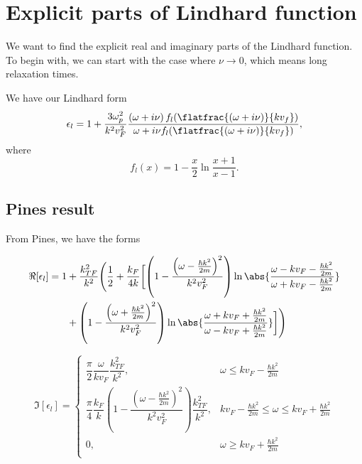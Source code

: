 \documentclass[../../main.tex]{subfiles}
\newcommand{\vf}{v_F}
\begin{document}
\section{Explicit parts of Lindhard function}

We want to find the explicit real and imaginary parts of the Lindhard function. To begin with, we can start with the case where $\nu \rightarrow 0$, which means long relaxation times.

We have our Lindhard form
\begin{equation} \label{eq:LindhardExplicitParts:LindhardEps}
 \epsilon_l = 1 + \frac{3 \omega_p^2}{k^2 v_F^2} \frac{\left(\omega + i \nu \right) f_l(\flatfrac{(\omega + i \nu)}{k v_f})}{\omega + i \nu f_l(\flatfrac{(\omega + i \nu)}{k v_f})},
\end{equation}
where
\begin{equation}
	f_l(x) = 1 - \frac{x}{2} \ln\frac{x + 1}{x - 1}.
\end{equation}

\subsection{Pines result}

From Pines, we have the forms

\begin{align}
	\Re[\epsilon_l]	= 1 &+ \frac{k_{TF}^2}{k^2} \Biggl(
		\frac12 + \frac{k_F}{4k} \biggl[
			\left( 1 - \frac{\left(\omega - \frac{\hbar k^2}{2m} \right)^2}{k^2\vf^2} \right) \ln\abs{\frac{\omega - k \vf - \frac{\hbar k^2}{2m}}{\omega + k \vf - \frac{\hbar k^2}{2m}}} \nonumber \\
			&+ \left(1 - \frac{\left(\omega + \frac{\hbar k^2}{2m} \right)^2}{k^2 \vf^2} \right) \ln\abs{\frac{\omega + k\vf + \frac{\hbar k^2}{2m}}{\omega - k \vf + \frac{\hbar k^2}{2m}}}
		\biggr]
	 \Biggr)  \label{eq:LindhardExplicitParts:PinesReal}
\end{align}

\begin{equation}
	\Im[\epsilon_l] = \begin{cases}
		\dfrac{\pi}{2} \dfrac{\omega}{k\vf} \dfrac{k_{TF}^2}{k^2}, & \omega \le k \vf - \frac{\hbar k^2}{2m} \\
		\dfrac{\pi}{4} \dfrac{k_F}{k} \left( 1 - \dfrac{\left(\omega - \frac{\hbar k^2}{2m}\right)^2 }{k^2\vf^2} \right)\dfrac{k_{TF}^2}{k^2}, & k \vf - \frac{\hbar k^2}{2m} \le \omega \le k \vf + \frac{\hbar k^2}{2m} \\
		0, & \omega \ge k \vf + \frac{\hbar k^2}{2m}  \\
	\end{cases} \label{eq:LindhardExplicitParts:PinesImaginary}
\end{equation}
\end{document}
